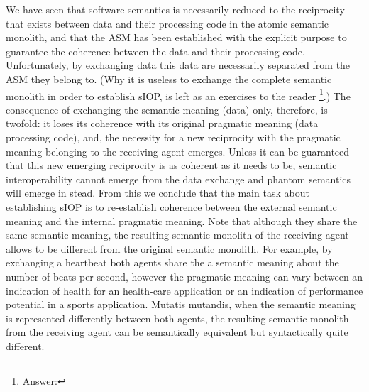 \documentclass[sort&compress,preprint,authoryear,3p,twocolumn]{elsarticle}
\begin{document}
We have seen that software semantics is necessarily reduced to the
reciprocity that exists between data and their processing code in the
atomic semantic monolith, and that the ASM has been established with the
explicit purpose to guarantee the coherence between the data and their
processing code. Unfortunately, by exchanging data this data are
necessarily separated from the ASM they belong to. (Why it is useless to
exchange the complete semantic monolith in order to establish sIOP, is
left as an exercises to the reader \footnote{Answer:
  }.)
The consequence of exchanging the semantic meaning (data) only,
therefore, is twofold: it loses its coherence with its original
pragmatic meaning (data processing code), and, the necessity for a new
reciprocity with the pragmatic meaning belonging to the receiving agent
emerges. Unless it can be guaranteed that this new emerging reciprocity
is as coherent as it needs to be, semantic interoperability cannot
emerge from the data exchange and phantom semantics will emerge in
stead. From this we conclude that the main task about establishing sIOP
is to re-establish coherence between the external semantic meaning and
the internal pragmatic meaning. Note that although they share the same
semantic meaning, the resulting semantic monolith of the receiving agent
allows to be different from the original semantic monolith. For example,
by exchanging a heartbeat both agents share the a semantic meaning about
the number of beats per second, however the pragmatic meaning can vary
between an indication of health for an health-care application or an
indication of performance potential in a sports application. Mutatis
mutandis, when the semantic meaning is represented differently between
both agents, the resulting semantic monolith from the receiving agent
can be semantically equivalent but syntactically quite different.
\end{document}

